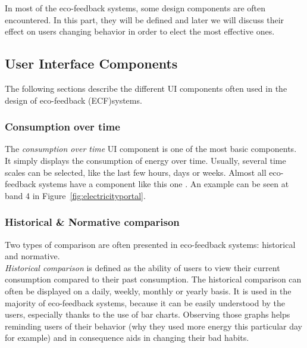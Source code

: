 \documentclass[journal]{vgtc}                %
\begin{document}
In most of the eco-feedback systems, some design components are often encountered.
In this part, they will be defined and later we will discuss their effect on users changing behavior in order to elect the most effective ones. 


\subsection{User Interface Components}
The following sections describe the different UI components often used in the design of eco-feedback (ECF)systems.
\subsubsection{Consumption over time}
The \textit{consumption over time} UI component is one of the most basic components. It simply displays the consumption of energy over time. Usually, several time scales can be selected, like the last few hours, days or weeks.
Almost all eco-feedback systems have a component like this one \cite{spagnolli2011eco}. 
An example can be seen at band 4 in Figure~\ref{fig:electricityportal}.

\subsubsection{Historical \& Normative comparison}
Two types of comparison are often presented in eco-feedback systems: historical and normative.\\

\textit{Historical comparison} is defined as the ability of users to view their current consumption compared to their past consumption. %
The historical comparison can often be displayed on a daily, weekly, monthly or yearly basis. It is used in the majority of eco-feedback systems\cite{spagnolli2011eco}, because it can be easily understood by the users, especially thanks to the use of bar charts. %
Observing those graphs helps reminding users of their behavior (why they used more energy this particular day for example) and in consequence aids in changing their bad habits.
\end{document}
